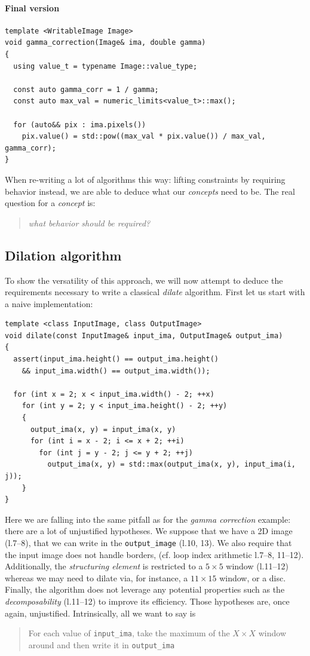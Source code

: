 \paragraph{Final version}

\begin{verbatim}
template <WritableImage Image>
void gamma_correction(Image& ima, double gamma)
{
  using value_t = typename Image::value_type;

  const auto gamma_corr = 1 / gamma;
  const auto max_val = numeric_limits<value_t>::max();

  for (auto&& pix : ima.pixels())
    pix.value() = std::pow((max_val * pix.value()) / max_val, gamma_corr);
}
\end{verbatim}

\noindent When re-writing a lot of algorithms this way: lifting constraints by requiring behavior instead, we are able
to deduce what our \emph{concepts} need to be. The real question for a \emph{concept} is: \blockquote{\emph{what
    behavior should be required?}}



\subsection{Dilation algorithm}
\label{subsec:dilation}

To show the versatility of this approach, we will now attempt to deduce the requirements necessary to write a classical
\emph{dilate} algorithm. First let us start with a naive implementation:

\begin{verbatim}
template <class InputImage, class OutputImage>
void dilate(const InputImage& input_ima, OutputImage& output_ima)
{
  assert(input_ima.height() == output_ima.height()
    && input_ima.width() == output_ima.width());

  for (int x = 2; x < input_ima.width() - 2; ++x)
    for (int y = 2; y < input_ima.height() - 2; ++y)
    {
      output_ima(x, y) = input_ima(x, y)
      for (int i = x - 2; i <= x + 2; ++i)
        for (int j = y - 2; j <= y + 2; ++j)
          output_ima(x, y) = std::max(output_ima(x, y), input_ima(i, j));
    }
}
\end{verbatim}

\noindent Here we are falling into the same pitfall as for the \emph{gamma correction} example: there are a lot of
unjustified hypotheses. We suppose that we have a 2D image (l.7--8), that we can write in the \texttt{output\_image}
(l.10, 13). We also require that the input image does not handle borders, (cf. loop index arithmetic l.7--8, 11--12).
Additionally, the \emph{structuring element} is restricted to a \(5 \times 5\) window (l.11--12) whereas we may need to
dilate via, for instance, a \(11 \times 15\) window, or a disc. Finally, the algorithm does not leverage  any potential
properties such as the \emph{decomposability} (l.11--12) to improve its efficiency. Those hypotheses are, once again,
unjustified. Intrinsically, all we want to say is \blockquote{For each value of \texttt{input\_ima}, take the maximum of
  the \(X \times X\) window around and then write it in \texttt{output\_ima}}.

